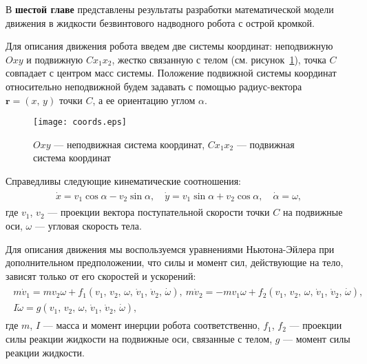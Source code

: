 В {\textbf{шестой главе}} представлены результаты разработки математической модели движения в жидкости безвинтового надводного робота с острой кромкой.

Для описания движения робота введем две системы координат: неподвижную $Oxy$ и подвижную $Cx_1x_2$, жестко связанную с телом (см. рисунок~\ref{fig.coords}), точка $C$ совпадает с центром масс системы. 
Положение подвижной системы координат относительно неподвижной будем задавать с помощью радиус-вектора $\bm r = (x,\, y)$ точки $C$, а ее ориентацию углом $\alpha$. %

\begin{figure}[h!]
	\centering
	\texttt{[image: coords.eps]}
	\caption{$Oxy$ --- неподвижная система координат, $Cx_1x_2$ --- подвижная система координат}\label{fig.coords}
\end{figure}

Справедливы следующие кинематические соотношения:
\begin{gather}
\begin{gathered}
\dot{x} = v_1 \cos\alpha - v_2 \sin\alpha,\quad \dot{y} = v_1 \sin\alpha + v_2 \cos\alpha,\quad \dot{\alpha} = \omega,
\end{gathered}\label{eq.kinem}
\end{gather}
где $v_1$, $v_2$ --- проекции вектора поступательной скорости точки $C$ на подвижные оси, $\omega$ --- угловая скорость тела.

Для описания движения мы воспользуемся уравнениями Ньютона-Эйлера при дополнительном предположении, что силы и момент сил, действующие на тело, зависят только от его скоростей и ускорений: %
\begin{gather}
\begin{gathered}
m \dot{v}_1 = m v_2 \omega + f_1 (v_1,\, v_2,\, \omega,\, \dot{v}_1,\, \dot{v}_2,\, \dot \omega),\
m \dot{v}_2 = -m v_1 \omega + f_2 (v_1,\, v_2,\, \omega,\, \dot{v}_1,\, \dot{v}_2,\, \dot \omega),\\
I \dot{\omega} = g (v_1,\, v_2,\, \omega,\, \dot{v}_1,\, \dot{v}_2,\, \dot \omega),
\end{gathered}\label{eq.NE}
\end{gather}
где $m$, $I$ --- масса и момент инерции робота соответственно, $f_1$, $f_2$ --- проекции силы реакции жидкости на подвижные оси, связанные с телом, $g$ --- момент силы реакции жидкости. 

